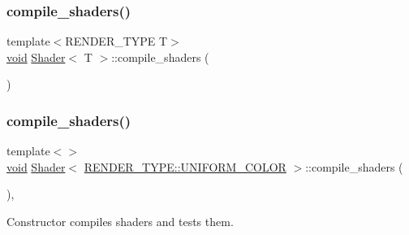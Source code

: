 \subsubsection{\texorpdfstring{compile\+\_\+shaders()}{compile\_shaders()}\hspace{0.1cm}{\footnotesize\ttfamily [1/3]}}
{\footnotesize\ttfamily template$<$R\+E\+N\+D\+E\+R\+\_\+\+T\+Y\+PE T$>$ \\
\mbox{\hyperlink{glad_8h_a950fc91edb4504f62f1c577bf4727c29}{void}} \mbox{\hyperlink{classShader}{Shader}}$<$ T $>$\+::compile\+\_\+shaders (\begin{DoxyParamCaption}{ }\end{DoxyParamCaption})\hspace{0.3cm}{\ttfamily [protected]}}

\mbox{\label{classShader_a3ffd553eceda4e9d5a1d8b4a5a157659}} 
\subsubsection{\texorpdfstring{compile\+\_\+shaders()}{compile\_shaders()}\hspace{0.1cm}{\footnotesize\ttfamily [2/3]}}
{\footnotesize\ttfamily template$<$$>$ \\
\mbox{\hyperlink{glad_8h_a950fc91edb4504f62f1c577bf4727c29}{void}} \mbox{\hyperlink{classShader}{Shader}}$<$ \mbox{\hyperlink{shader__class_8hpp_a24e288e18eb7b6e01de7565001fedb60aa98862073f71a928bad5099cc3e1c2ed}{R\+E\+N\+D\+E\+R\+\_\+\+T\+Y\+P\+E\+::\+U\+N\+I\+F\+O\+R\+M\+\_\+\+C\+O\+L\+OR}} $>$\+::compile\+\_\+shaders (\begin{DoxyParamCaption}{ }\end{DoxyParamCaption})\hspace{0.3cm}{\ttfamily [inline]}, {\ttfamily [protected]}}



Constructor compiles shaders and tests them. 

\mbox{\label{classShader_ae486635d367b6054482c56747ed74846}} 
